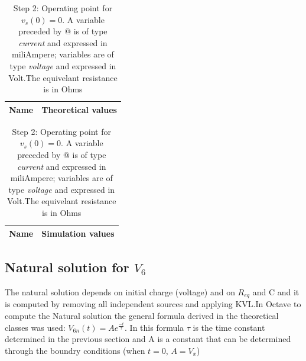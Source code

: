 \begin{table}[H]
\parbox{.30\linewidth}{
  \centering
  \begin{tabular}{|l|r|}
    \hline    
    {\bf Name} & {\bf Theoretical values }\\ \hline
    
  \end{tabular}
  \caption{A variable that stars with a "V" is of type {\it voltage} and expressed in
    Volt (V).The variable $R_{eq}$ is expresses in Ohm and the variable $\tau$ is expressed in seconds }
  \label{tab:equivalent resistor}
}
 \hfill
 \parbox{.30\linewidth}{
  \centering
  \begin{tabular}{|l|r|}
    \hline    
    {\bf Name} & {\bf Simulation values } \\ \hline
    
  \end{tabular}
  \caption{Step 2: Operating point for {\it $v_s(0)=0$}. A variable preceded by @ is of type {\em current}
    and expressed in miliAmpere; variables are of type {\it voltage} and expressed in
    Volt.The equivelant resistance is in Ohms}
  \label{tab:opeq}
  }
\end{table}



\pagebreak
\subsection{Natural solution for $V_6$}

The natural solution depends on initial charge (voltage) and on $R_{eq}$ and C and it is computed by removing all independent sources and applying KVL.In Octave to compute the Natural solution the general formula derived in the theoretical classes was used: $V_{6n}(t)=Ae^{\frac{-t}{\tau}}$. In this formula $\tau$ is the time constant determined in the previous section and  A is a constant that can be determined through the boundry conditions (when $t=0$, $A=V_x$)

